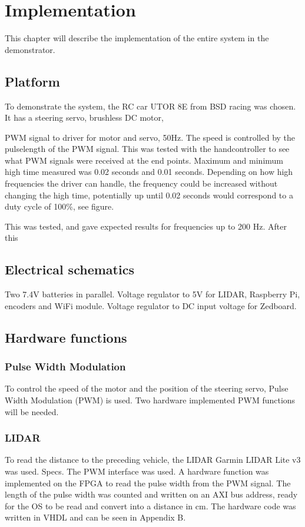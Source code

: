 \chapter{Implementation}
This chapter will describe the implementation of the entire system in the demonstrator.

\section{Platform}
To demonstrate the system, the RC car UTOR 8E from BSD racing was chosen. It has a steering servo, brushless DC motor, 

PWM signal to driver for motor and servo, 50Hz. The speed is controlled by the pulselength of the PWM signal. This was tested with the handcontroller to see what PWM signals were received at the end points. Maximum and minimum high time measured was 0.02 seconds and 0.01 seconds. Depending on how high frequencies the driver can handle, the frequency could be increased without changing the high time, potentially up until 0.02 seconds would correspond to a duty cycle of 100\%, see figure.


This was tested, and gave expected results for frequencies up to 200 Hz. After this 

\section{Electrical schematics}
Two 7.4V batteries in parallel. Voltage regulator to 5V for LIDAR, Raspberry Pi, encoders and WiFi module. Voltage regulator to DC input voltage for Zedboard.

\section{Hardware functions}

\subsection{Pulse Width Modulation}
To control the speed of the motor and the position of the steering servo, Pulse Width Modulation (PWM) is used. Two hardware implemented PWM functions will be needed.

\subsection{LIDAR}
To read the distance to the preceding vehicle, the LIDAR Garmin LIDAR Lite v3 was used. Specs. The PWM interface was used. A hardware function was implemented on the FPGA to read the pulse width from the PWM signal. The length of the pulse width was counted and written on an AXI bus address, ready for the OS to be read and convert into a distance in cm. The hardware code was written in VHDL and can be seen in Appendix B.

